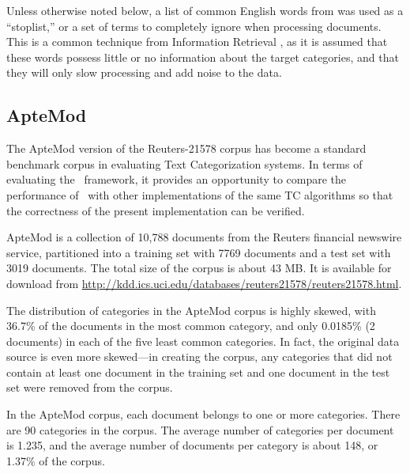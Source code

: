 Unless otherwise noted below, a list of common English words from
\cite{salton:89} was used as a ``stoplist,'' or a set of terms to
completely ignore when processing documents.  This is a common technique from
Information Retrieval \cite[sec. 15.1.1]{manning:99}, as it is assumed that these words
possess little or no information about the target categories, and that
they will only slow processing and add noise to the data.


\subsection{ApteMod}


The ApteMod version of the Reuters-21578 corpus has become a standard
benchmark corpus in evaluating Text Categorization
systems. \cite{yang:99,joachims:98} In terms of evaluating the \aicat\
framework, it provides an opportunity to compare the performance of
\aicat\ with other implementations of the same TC algorithms so that
the correctness of the present implementation can be verified.

ApteMod is a collection of 10,788 documents from the Reuters financial
newswire service, partitioned into a training set with 7769
documents and a test set with 3019 documents.  The total size of the
corpus is about 43 MB.  It is available for download from
\url{http://kdd.ics.uci.edu/databases/reuters21578/reuters21578.html}.

The distribution of categories in the ApteMod corpus is highly skewed,
with 36.7\% of the documents in the most common category, and only
0.0185\% (2 documents) in each of the five least common categories.
In fact, the original data source is even more skewed---in creating
the corpus, any categories that did not contain at least one document
in the training set and one document in the test set were removed from
the corpus. \cite{yang:99}

In the ApteMod corpus, each document belongs to one or more
categories.  There are 90 categories in the corpus.  The average
number of categories per document is 1.235, and the average number of
documents per category is about 148, or 1.37\% of the corpus.


